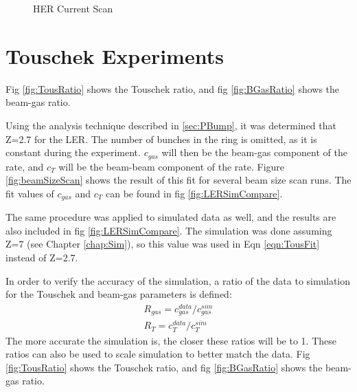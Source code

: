 \begin{figure}
	\centering
	\caption[HER Current Scan]{HER Current Scan}		
\label{fig:HERCURScan}
\end{figure}


\section{Touschek Experiments}


Fig \ref{fig:TousRatio} shows the Touschek ratio, and fig \ref{fig:BGasRatio} shows the beam-gas ratio.




Using the analysis technique described in \ref{sec:PBump}, it was determined that Z=2.7 for the LER. The number of bunches in the ring is omitted, as it is constant during the experiment. $c_{gas}$ will then be the beam-gas component of the rate, and $c_{T}$ will be the beam-beam component of the rate. Figure \ref{fig:beamSizeScan} shows the result of this fit for several beam size scan runs. The fit values of $c_{gas}$ and $c_{T}$ can be found in fig \ref{fig:LERSimCompare}.

	The same procedure was applied to simulated data as well, and the results are also included in fig \ref{fig:LERSimCompare}. The simulation was done assuming Z=7 (see Chapter \ref{chap:Sim}), so this value was used in Eqn \ref{eqn:TousFit} instead of Z=2.7.

	In order to verify the accuracy of the simulation, a ratio of the data to simulation for the Touschek and beam-gas parameters is defined:
\begin{subequations}
\begin{align}
		{R_{gas} = c_{gas}^{data}/c_{gas}^{sim}} \\
		{R_{T} = c_{T}^{data}/c_{T}^{sim}}
\end{align}
\end{subequations}
The more accurate the simulation is, the closer these ratios will be to 1. These ratios can also be used to scale simulation to better match the data. Fig \ref{fig:TousRatio} shows the Touschek ratio, and fig \ref{fig:BGasRatio} shows the beam-gas ratio.




